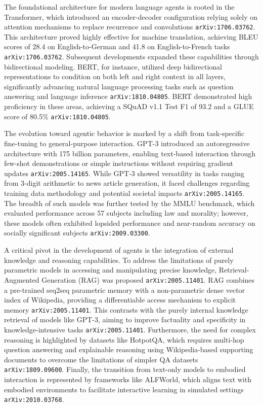 \documentclass[11pt]{article}
\begin{document}
The foundational architecture for modern language agents is rooted in the Transformer, which introduced an encoder-decoder configuration relying solely on attention mechanisms to replace recurrence and convolutions \texttt{arXiv:1706.03762}. This architecture proved highly effective for machine translation, achieving BLEU scores of 28.4 on English-to-German and 41.8 on English-to-French tasks \texttt{arXiv:1706.03762}. Subsequent developments expanded these capabilities through bidirectional modeling. BERT, for instance, utilized deep bidirectional representations to condition on both left and right context in all layers, significantly advancing natural language processing tasks such as question answering and language inference \texttt{arXiv:1810.04805}. BERT demonstrated high proficiency in these areas, achieving a SQuAD v1.1 Test F1 of 93.2 and a GLUE score of 80.5\% \texttt{arXiv:1810.04805}.

The evolution toward agentic behavior is marked by a shift from task-specific fine-tuning to general-purpose interaction. GPT-3 introduced an autoregressive architecture with 175 billion parameters, enabling text-based interaction through few-shot demonstrations or simple instructions without requiring gradient updates \texttt{arXiv:2005.14165}. While GPT-3 showed versatility in tasks ranging from 3-digit arithmetic to news article generation, it faced challenges regarding training data methodology and potential societal impacts \texttt{arXiv:2005.14165}. The breadth of such models was further tested by the MMLU benchmark, which evaluated performance across 57 subjects including law and morality; however, these models often exhibited lopsided performance and near-random accuracy on socially significant subjects \texttt{arXiv:2009.03300}.

A critical pivot in the development of agents is the integration of external knowledge and reasoning capabilities. To address the limitations of purely parametric models in accessing and manipulating precise knowledge, Retrieval-Augmented Generation (RAG) was proposed \texttt{arXiv:2005.11401}. RAG combines a pre-trained seq2seq parametric memory with a non-parametric dense vector index of Wikipedia, providing a differentiable access mechanism to explicit memory \texttt{arXiv:2005.11401}. This contrasts with the purely internal knowledge retrieval of models like GPT-3, aiming to improve factuality and specificity in knowledge-intensive tasks \texttt{arXiv:2005.11401}. Furthermore, the need for complex reasoning is highlighted by datasets like HotpotQA, which requires multi-hop question answering and explainable reasoning using Wikipedia-based supporting documents to overcome the limitations of simpler QA datasets \texttt{arXiv:1809.09600}. Finally, the transition from text-only models to embodied interaction is represented by frameworks like ALFWorld, which aligns text with embodied environments to facilitate interactive learning in simulated settings \texttt{arXiv:2010.03768}.
\end{document}
